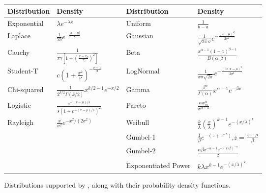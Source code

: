 \begin{figure}[!t]
    \centering
    \caption{Distributions supported by \Slice{}, along with their probability density functions.}
    \label{fig:densities}
    \begin{tabular}{l l @{\qquad} l l}
    \toprule
    \textbf{Distribution} & \textbf{Density} & \textbf{Distribution} & \textbf{Density} \\
    \midrule
    Exponential & $\lambda e^{-\lambda x}$ 
        & Uniform & $\frac{1}{b - a}$ \\
    Laplace & $\frac{1}{2b} e^{-\frac{|x - \mu|}{b}}$ 
        & Gaussian & $\frac{1}{\sqrt{2\pi}\sigma} e^{-\frac{(x - \mu)^2}{2\sigma^2}}$ \\
    Cauchy & $\frac{1}{\pi \gamma \left[1 + \left(\frac{x - x_0}{\gamma}\right)^2\right]}$ 
        & Beta & $\frac{x^{\alpha - 1}(1 - x)^{\beta - 1}}{B(\alpha, \beta)}$ \\
    Student-T & $c \left(1 + \frac{x^2}{\nu} \right)^{-\frac{\nu + 1}{2}}$ 
        & LogNormal & $\frac{1}{x\sigma \sqrt{2\pi}} e^{-\frac{(\ln x - \mu)^2}{2\sigma^2}}$ \\
    Chi-squared & $\frac{1}{2^{k/2} \Gamma(k/2)} x^{k/2 - 1} e^{-x/2}$ 
        & Gamma & $\frac{\beta^\alpha}{\Gamma(\alpha)} x^{\alpha - 1} e^{-\beta x}$ \\
    Logistic & $\frac{e^{-(x - \mu)/s}}{s(1 + e^{-(x - \mu)/s})^2}$ 
        & Pareto & $\frac{\alpha x_m^\alpha}{x^{\alpha + 1}}$ \\
    Rayleigh & $\frac{x}{\sigma^2} e^{-x^2 / (2\sigma^2)}$ 
        & Weibull & $\frac{k}{\lambda} \left( \frac{x}{\lambda} \right)^{k-1} e^{-(x/\lambda)^k}$ \\
    & & Gumbel-1 & $\frac{1}{\beta} e^{-(z + e^{-z})}$,\quad $z = \frac{x - \mu}{\beta}$ \\
    & & Gumbel-2 & $\frac{\alpha \beta x^{-\alpha - 1} e^{-(x/\beta)^{-\alpha}}}{\beta}$ \\
    & & Exponentiated Power & $k \lambda x^{k - 1} e^{-(x/\lambda)^k}$ \\
    \bottomrule
    \end{tabular}
    \end{figure}
    